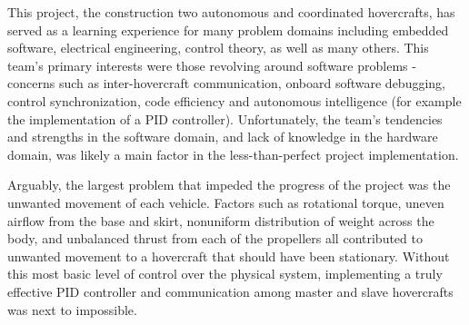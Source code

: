 This project, the construction two autonomous and coordinated hovercrafts, has served as a learning experience for many problem domains including embedded software, electrical engineering, control theory, as well as many others.  This team's primary interests were those revolving around software problems - concerns such as inter-hovercraft communication, onboard software debugging, control synchronization, code efficiency and autonomous intelligence (for example the implementation of a PID controller).  Unfortunately, the team's tendencies and strengths in the software domain, and lack of knowledge in the hardware domain, was likely a main factor in the less-than-perfect project implementation.  

Arguably, the largest problem that impeded the progress of the project was the unwanted movement of each vehicle.  Factors such as rotational torque, uneven airflow from the base and skirt, nonuniform distribution of weight across the body, and unbalanced thrust from each of the propellers all contributed to unwanted movement to a hovercraft that should have been stationary.  Without this most basic level of control over the physical system, implementing a truly effective PID controller and communication among master and slave hovercrafts was next to impossible.  